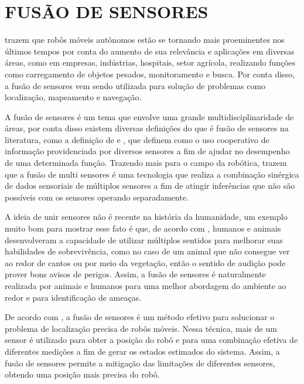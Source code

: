 \documentclass[acronym, symbols, table]{fei}
\begin{document}
	\section{FUSÃO DE SENSORES}
	
		\textcite{alatise2020review} trazem que robôs móveis autônomos estão se tornando mais proeminentes nos últimos tempos por conta do aumento de sua relevância e aplicações em diversas áreas, como em empresas, indústrias, hospitais, setor agrícola, realizando funções como carregamento de objetos pesados, monitoramento e busca. Por conta disso, a fusão de sensores vem sendo utilizada para solução de problemas como localização, mapeamento e navegação.
		
		A fusão de sensores é um tema que envolve uma grande multidisciplinaridade de áreas, por conta disso existem diversas definições do que é fusão de sensores na literatura, como a definição de \textcite{castanedo2013review} e \textcite{nagla2014multisensor}, que definem como o uso cooperativo de informação providenciada por diversos sensores a fim de ajudar no desempenho de uma determinada função. Trazendo mais para o campo da robótica, \textcite{luo2011multisensor} trazem que a fusão de multi sensores é uma tecnologia que realiza a combinação sinérgica de dados sensoriais de múltiplos sensores a fim de atingir inferências que não são possíveis com os sensores operando separadamente.
		
		A ideia de unir sensores não é recente na história da humanidade, um exemplo muito bom para mostrar esse fato é que, de acordo com \textcite{hall1997introduction}, humanos e animais desenvolveram a capacidade de utilizar múltiplos sentidos para melhorar suas habilidades de sobrevivência, como no caso de um animal que não consegue ver ao redor de cantos ou por meio da vegetação, então o sentido de audição pode prover bons avisos de perigos. Assim, a fusão de sensores é naturalmente realizada por animais e humanos para uma melhor abordagem do ambiente ao redor e para identificação de ameaças.
		
		De acordo com \textcite{marton2013two}, a fusão de sensores é um método efetivo para solucionar o problema de localização precisa de robôs móveis. Nessa técnica, mais de um sensor é utilizado para obter a posição do robô e para uma combinação efetiva de diferentes medições a fim de gerar os estados estimados do sistema. Assim, a fusão de sensores permite a mitigação das limitações de diferentes sensores, obtendo uma posição mais precisa do robô.
		
\end{document}
